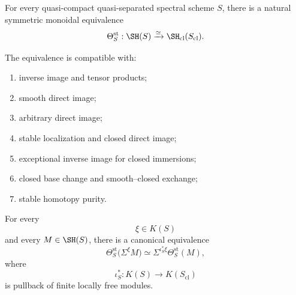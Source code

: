 \begin{theorem}
\label{thm:stable-classical-comparison}
For every quasi-compact quasi-separated spectral scheme \(S\), there is a
natural symmetric monoidal equivalence
\[
    \Theta_S^{\mathrm{st}}:
    \SH(S)
    \xrightarrow{\simeq}
    \SH_{\mathrm{cl}}(S_{\mathrm{cl}}).
\]

The equivalence is compatible with:
\begin{enumerate}
    \item inverse image and tensor products;
    \item smooth direct image;
    \item arbitrary direct image;
    \item stable localization and closed direct image;
    \item exceptional inverse image for closed immersions;
    \item closed base change and smooth--closed exchange;
    \item stable homotopy purity.
\end{enumerate}

For every
\[
    \xi\in K(S)
\]
and every \(M\in\SH(S)\), there is a canonical equivalence
\[
    \Theta_S^{\mathrm{st}}
    \bigl(
      \Sigma^\xi M
    \bigr)
    \simeq
    \Sigma^{\iota_S^*\xi}
    \Theta_S^{\mathrm{st}}(M),
\]
where
\[
    \iota_S^*:
    K(S)
    \longrightarrow
    K(S_{\mathrm{cl}})
\]
is pullback of finite locally free modules.
\end{theorem}

